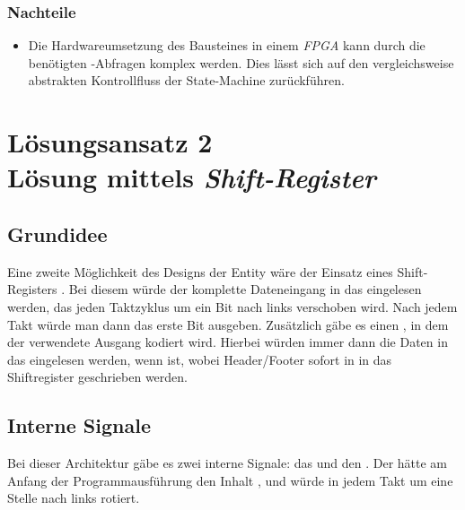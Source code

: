 \documentclass{article}
\begin{document}
    \subsubsection{Nachteile}
      \begin{itemize}
        \item Die Hardwareumsetzung des Bausteines in einem \emph{FPGA} kann durch die benötigten -Abfragen komplex werden. Dies lässt sich auf den vergleichsweise abstrakten Kontrollfluss der State-Machine zurückführen.
      \end{itemize}

\section{Lösungsansatz 2 \\ Lösung mittels \emph{Shift-Register}}

    \subsection{Grundidee}
        Eine zweite Möglichkeit des Designs der Entity wäre der Einsatz eines Shift-Registers . Bei diesem würde der komplette Dateneingang in das  eingelesen werden, das jeden Taktzyklus um ein Bit nach links verschoben wird. Nach jedem Takt würde man dann das erste Bit ausgeben. Zusätzlich gäbe es einen , in dem der verwendete Ausgang kodiert wird. Hierbei würden immer dann die Daten in das  eingelesen werden, wenn  ist, wobei Header/Footer sofort in in das Shiftregister geschrieben werden.

    \subsection{Interne Signale}
        Bei dieser Architektur gäbe es zwei interne Signale: das  und den . Der  hätte am Anfang der Programmausführung den Inhalt , und würde in jedem Takt um eine Stelle nach links rotiert.
\end{document}
